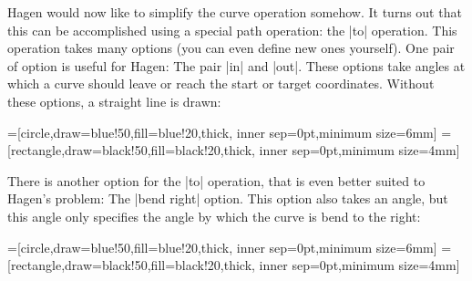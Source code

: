 Hagen would now like to simplify the curve operation somehow. It turns
out that this can be accomplished using a special path operation: the
|to| operation. This operation takes many options (you can even define
new ones yourself). One pair of option is useful for Hagen: The pair
|in| and |out|. These options take angles at which a curve should
leave or reach the start or target coordinates. Without these options,
a straight line is drawn:

{
=[circle,draw=blue!50,fill=blue!20,thick,
                   inner sep=0pt,minimum size=6mm]
=[rectangle,draw=black!50,fill=black!20,thick,
                        inner sep=0pt,minimum size=4mm]
\begin{codeexample}[]
\end{codeexample}
}

There is another option for the |to| operation, that is even better
suited to Hagen's problem: The |bend right| option. This option also
takes an angle, but this angle only specifies the angle by which the
curve is bend to the right:

{
=[circle,draw=blue!50,fill=blue!20,thick,
                   inner sep=0pt,minimum size=6mm]
=[rectangle,draw=black!50,fill=black!20,thick,
                        inner sep=0pt,minimum size=4mm]
\begin{codeexample}[]
\end{codeexample}
}

